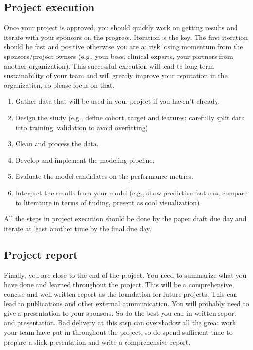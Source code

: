 \documentclass[journal]{IEEEtran}
\begin{document}
\subsection{Project execution }
Once your project is approved, you should quickly work on getting results and iterate with your sponsors on the progress. Iteration is the key. The first iteration should be fast and positive otherwise you are at risk losing momentum from the sponsors/project owners (e.g., your boss, clinical experts, your partners from another organization). This successful execution will lead to long-term sustainability of your team and will greatly improve your reputation in the organization, so please focus on that. 
\begin{enumerate}
\item Gather data that will be used in your project if you haven't already. 
\item Design the study (e.g., define cohort, target and features;  carefully split data into training, validation to avoid overfitting)
\item Clean and process the data. 
\item Develop and implement the modeling pipeline. 
\item Evaluate the model candidates on the performance metrics. 
\item Interpret the results from your model (e.g., show predictive features, compare to literature in terms of finding, present as cool visualization). 
\end{enumerate}

All the steps in project execution should be done by the paper draft due day and iterate at least another time by the final due day.
\subsection{Project report}
Finally, you are close to the end of the project. You need to summarize what you have done and learned throughout the project. This will be a comprehensive, concise and well-written report as the foundation for future projects. This can lead to publications and other external communication. You will probably need to give a presentation to your sponsors. So do the best you can in written report and presentation. Bad delivery at this step can overshadow all the great work your team have put in throughout the project, so do spend sufficient time to prepare a slick presentation and write a comprehensive report. 
\end{document}
